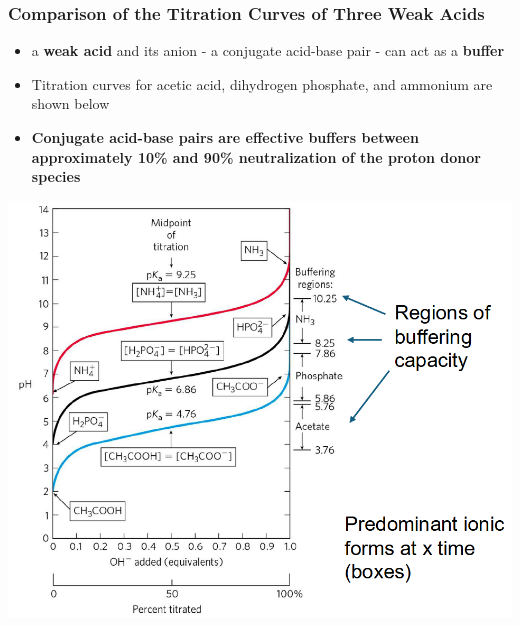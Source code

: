 \documentclass[10pt]{article}
\begin{document}
\subsubsection*{Comparison of the Titration Curves of Three Weak Acids}
\begin{itemize}
    \item a \textbf{weak acid} and its anion - a conjugate acid-base pair - can act as a \textbf{buffer}
    \item Titration curves for acetic acid, dihydrogen phosphate, and ammonium are shown below
    \item \textbf{Conjugate acid-base pairs are effective buffers between approximately 10\% and 90\% neutralization of the proton donor species}
\end{itemize}
\begin{center}
    \includegraphics[scale=0.5]{L1_2.png}
\end{center}
\end{document}
